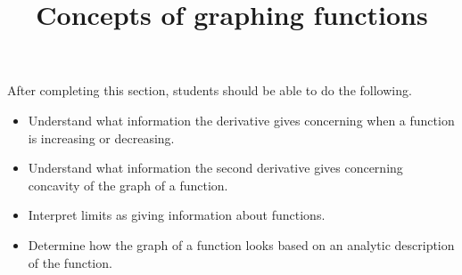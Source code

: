 \documentclass{ximera}
\title{Concepts of graphing functions}
\begin{document}
\begin{abstract}
\end{abstract}

\maketitle

\begin{sectionOutcomes}

After completing this section, students should be able to do the following.

\begin{itemize}
\item Understand what information the derivative gives concerning when
  a function is increasing or decreasing.
\item Understand what information the second derivative gives
  concerning concavity of the graph of a  function.
\item Interpret limits as giving information about functions.
\item Determine how the graph of a function looks based on an analytic
  description of the function.
\end{itemize}

\end{sectionOutcomes}
\end{document}
